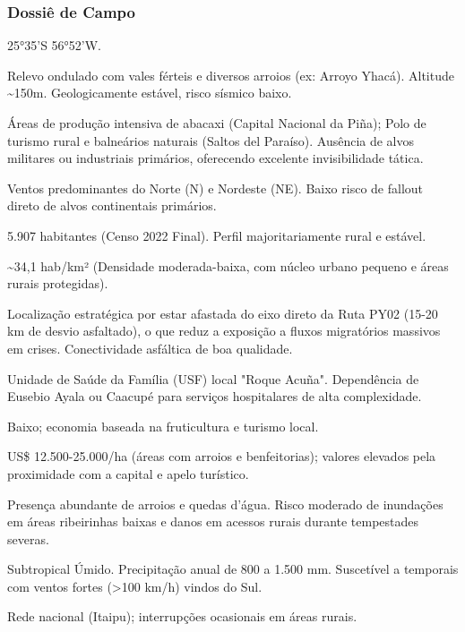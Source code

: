 \subsubsection{Dossiê de Campo}
\begin{description}[style=nextline,leftmargin=0.5cm,font=\bfseries]
\item[Coordenadas]  25°35'S 56°52'W.
\item[Topografia]  Relevo ondulado com vales férteis e diversos arroios (ex: Arroyo Yhacá). Altitude \textasciitilde 150m. Geologicamente estável, risco sísmico baixo.
\item[Alvos Estratégicos]  Áreas de produção intensiva de abacaxi (Capital Nacional da Piña); Polo de turismo rural e balneários naturais (Saltos del Paraíso). Ausência de alvos militares ou industriais primários, oferecendo excelente invisibilidade tática.
\item[Fallout]  Ventos predominantes do Norte (N) e Nordeste (NE). Baixo risco de fallout direto de alvos continentais primários.
\item[População]  5.907 habitantes (Censo 2022 Final). Perfil majoritariamente rural e estável.
\item[Densidade]  \textasciitilde 34,1 hab/\allowbreak km² (Densidade moderada-baixa, com núcleo urbano pequeno e áreas rurais protegidas).
\item[Vias de Acesso]  Localização estratégica por estar afastada do eixo direto da Ruta PY02 (15-20 km de desvio asfaltado), o que reduz a exposição a fluxos migratórios massivos em crises. Conectividade asfáltica de boa qualidade.
\item[Serviços]  Unidade de Saúde da Família (USF) local "Roque Acuña". Dependência de Eusebio Ayala ou Caacupé para serviços hospitalares de alta complexidade.
\item[Custo de Vida]  Baixo; economia baseada na fruticultura e turismo local.
\item[Preço da Terra]  US\$ 12.500-25.000/\allowbreak ha (áreas com arroios e benfeitorias); valores elevados pela proximidade com a capital e apelo turístico.
\item[Hidrologia]  Presença abundante de arroios e quedas d'água. Risco moderado de inundações em áreas ribeirinhas baixas e danos em acessos rurais durante tempestades severas.
\item[Clima]  Subtropical Úmido. Precipitação anual de 800 a 1.500 mm. Suscetível a temporais com ventos fortes (>100 km/\allowbreak h) vindos do Sul.
\item[Energia]  Rede nacional (Itaipu); interrupções ocasionais em áreas rurais.

\end{description}
